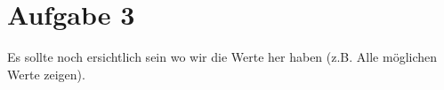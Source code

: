 \pagebreak
\section*{Aufgabe 3}
Es sollte noch ersichtlich sein wo wir die Werte her haben (z.B. Alle möglichen Werte zeigen).